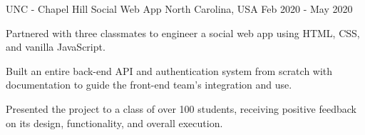 \begin{cventries}
  \cventry
    {UNC - Chapel Hill} %
    {Social Web App} %
    {North Carolina, USA} %
    {Feb 2020 - May 2020} %
    {
      \begin{cvitems} %
        \item {Partnered with three classmates to engineer a social web app using HTML, CSS, and vanilla JavaScript.}
        \item {Built an entire back-end API and authentication system from scratch with documentation to guide the front-end team's integration and use.}
        \item {Presented the project to a class of over 100 students, receiving positive feedback on its design, functionality, and overall execution.}
      \end{cvitems}
    }





\end{cventries}
